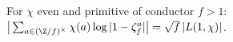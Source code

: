 For $\chi$ even and primitive of conductor $f>1$: $\big|\sum_{a\in(\Z/f)^\times}\chi(a)\log|1-\zeta_f^a|\big|=\sqrt f\,|L(1,\chi)|$.
